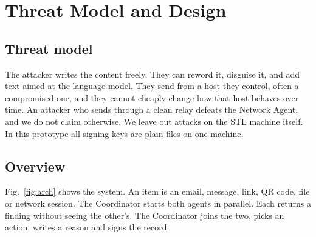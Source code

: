 \section{Threat Model and Design}

\subsection{Threat model}

The attacker writes the content freely. They can reword it, disguise it, and add text aimed at the language model. They send from a host they control, often a compromised one, and they cannot cheaply change how that host behaves over time. An attacker who sends through a clean relay defeats the Network Agent, and we do not claim otherwise. We leave out attacks on the STL machine itself. In this prototype all signing keys are plain files on one machine.

\subsection{Overview}

Fig.~\ref{fig:arch} shows the system. An item is an email, message, link, QR code, file or network session. The Coordinator starts both agents in parallel. Each returns a finding without seeing the other's. The Coordinator joins the two, picks an action, writes a reason and signs the record.

